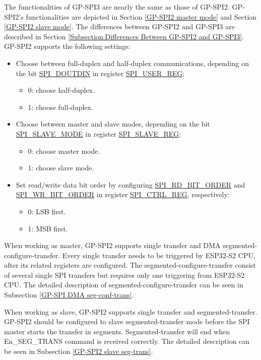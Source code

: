 \documentclass[main\_\_EN.tex]{subfiles}
\begin{document}
The functionalities of GP-SPI3 are nearly the same as those of GP-SPI2. GP-SPI2's functionalities are depicted in Section \ref{GP-SPI2 master mode} and Section \ref{GP-SPI2 slave mode}. The differences between GP-SPI2 and GP-SPI3 are described in Section \ref{Subsection:Differences Between GP-SPI2 and GP-SPI3}.
GP-SPI2 supports the following settings:

\begin{itemize}
    \item Choose between full-duplex and half-duplex communications, depending on the bit \hyperref[fielddesc:SPIDOUTDIN]{SPI\_DOUTDIN} in register \hyperref[regdesc:SPIUSERREG]{SPI\_USER\_REG}:
    \begin{itemize}
        \item 0: choose half-duplex.
        \item 1: choose full-duplex.
    \end{itemize}
    \item Choose between master and slave modes, depending on the bit \hyperref[fielddesc:SPISLAVEMODE]{SPI\_SLAVE\_MODE} in register \hyperref[regdesc:SPISLAVEREG]{SPI\_SLAVE\_REG}:
    \begin{itemize}
        \item 0: choose master mode.
        \item 1: choose slave mode.
    \end{itemize}
    \item Set read/write data bit order by configuring \hyperref[fielddesc:SPIRDBITORDER]{SPI\_RD\_BIT\_ORDER} and \hyperref[fielddesc:SPIWRBITORDER]{SPI\_WR\_BIT\_ORDER} in register \hyperref[regdesc:SPICTRLREG]{SPI\_CTRL\_REG}, respectively:
    \begin{itemize}
        \item 0: LSB first.
        \item 1: MSB first.
    \end{itemize}
\end{itemize}

When working as master, GP-SPI2 supports single transfer and DMA segmented-configure-transfer. Every single transfer needs to be triggered by ESP32-S2 CPU, after its related registers are configured. The segmented-configure-transfer consist of several single SPI transfers but requires only one triggering from ESP32-S2 CPU. The detailed description of segmented-configure-transfer can be seen in Subsection \ref{GP-SPI DMA seg-conf-trans}.

When working as slave, GP-SPI2 supports single transfer and segmented-transfer. GP-SPI2 should be configured to slave segmented-transfer mode before the SPI master starts the transfer in segments. Segmented-transfer will end when En\_SEG\_TRANS command is received correctly. The detailed description can be seen in Subsection \ref{GP-SPI2 slave seg-trans}.
\end{document}
